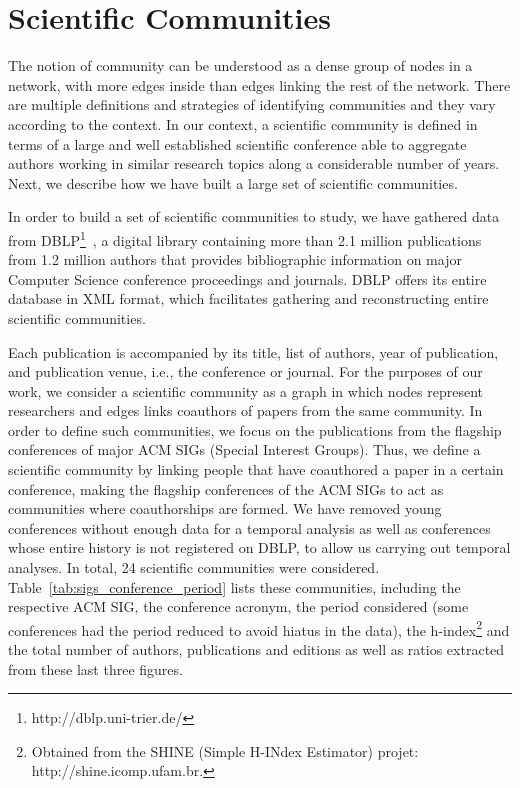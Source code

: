 \section{Scientific Communities}


The notion of community can be understood as a dense group of nodes in a network, with more edges inside than edges linking the rest of the network.  There are multiple definitions
and strategies of identifying communities and they vary according to the context. In our context, a scientific community is defined in terms of a large and well established
scientific conference able to aggregate authors working in similar research topics along a considerable number of years. Next, we describe how we have built a large set of
scientific communities.


In order to build a set of scientific communities to study, we have gathered data from DBLP\footnote{http://dblp.uni-trier.de/}~\cite{Ley:2009}, a digital library containing more
than 2.1 million publications from 1.2 million authors that provides bibliographic information on major Computer Science conference proceedings and journals.  DBLP offers its
entire database in XML format, which facilitates gathering and reconstructing entire scientific communities. 

Each publication is accompanied by its title, list of authors, year of publication, and publication venue, i.e., the conference or journal. For the purposes of our work, we
consider a scientific community as a graph in which nodes represent researchers and edges links coauthors of papers from the same community.  In order to define such communities,
we focus on the publications from the flagship conferences of major ACM SIGs (Special Interest Groups).  Thus, we define a scientific community by linking people that have
coauthored a paper in a certain conference, making the flagship conferences of the ACM SIGs to act as communities where coauthorships are formed. We have removed young conferences
without enough data for a temporal analysis as well as conferences whose entire history is not registered on DBLP, to allow us carrying out temporal analyses. In total, 24
scientific communities were considered. Table~\ref{tab:sigs_conference_period} lists these communities, including the respective ACM SIG, the conference acronym, the period
considered (some conferences had the period reduced to avoid hiatus in the data), the h-index\footnote{Obtained from the SHINE (Simple H-INdex Estimator) projet:
http://shine.icomp.ufam.br.} and the total number of authors, publications and editions as well as ratios extracted from these last three figures.

